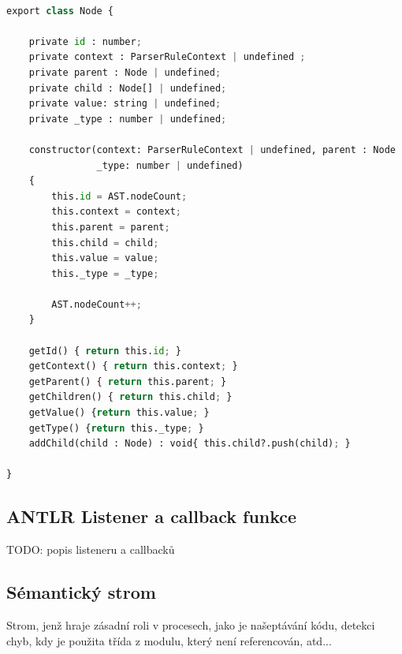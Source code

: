 \documentclass[czech,master,dept460,male,cpp,cpdeclaration]{diploma}
\begin{document}
\begin{center}
\begin{lstlisting}[language=Python,label=src:PythonListing,caption={třída Node v jazyce Typescript}]

export class Node {  

    private id : number;
    private context : ParserRuleContext | undefined ;
    private parent : Node | undefined;
    private child : Node[] | undefined;
    private value: string | undefined;
    private _type : number | undefined;

    constructor(context: ParserRuleContext | undefined, parent : Node | undefined, child : Node[] | undefined, value : string | undefined,
                _type: number | undefined) 
    {
        this.id = AST.nodeCount;
        this.context = context;
        this.parent = parent;
        this.child = child;
        this.value = value;
        this._type = _type;

        AST.nodeCount++;
    }

    getId() { return this.id; }
    getContext() { return this.context; } 
    getParent() { return this.parent; }
    getChildren() { return this.child; }
    getValue() {return this.value; }
    getType() {return this._type; }
    addChild(child : Node) : void{ this.child?.push(child); }

}
\end{lstlisting}
\end{center}

\subsection{ANTLR Listener a callback funkce}
TODO: popis listeneru a callbacků

\subsection{Sémantický strom}
Strom, jenž hraje zásadní roli v procesech, jako je našeptávání kódu, detekci chyb, kdy je použita třída z modulu, který není referencován, atd...
\end{document}
